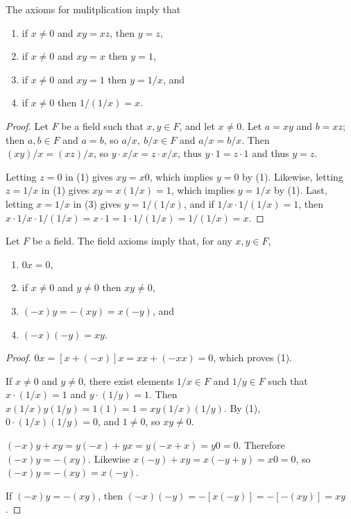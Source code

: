 \documentclass[12pt]{article}
\begin{document}
\begin{thm}
  The axioms for mulitplication imply that
  \begin{enumerate}
    \item
      if $x \neq 0$ and $xy = xz$, then $y = z$,
    \item
      if $x \neq 0$ and $xy = x$ then $y = 1$,
    \item
      if $x \neq 0$ and $xy = 1$ then $y = 1/x$, and
    \item
      if $x \neq 0$ then $1/(1/x) = x$.
  \end{enumerate}

  \begin{proof}
    Let $F$ be a field such that $x,y \in F$, and let $x \neq 0$. Let $a = xy$ and $b
    = xz$; then $a,b \in F$ and $a = b$, so $a/x,\ b/x \in F$ and $a/x = b/x$. Then
    $(xy)/x = (xz)/x$, so $y \cdot x/x = z \cdot x/x$, thus $y \cdot 1 = z \cdot 1$
    and thus $y = z$.

    Letting $z = 0$ in (1) gives $xy = x0$, which implies $y = 0$ by (1).  Likewise,
    letting $z = 1/x$ in (1) gives $xy = x(1/x) = 1$, which implies $y = 1/x$ by (1).
    Last, letting $x = 1/x$ in (3) gives $y = 1/(1/x)$, and if $1/x \cdot 1/(1/x) =
    1$, then $x \cdot 1/x \cdot 1/(1/x) = x \cdot 1 = 1 \cdot 1/(1/x) = 1/(1/x) = x$.
  \end{proof}
\end{thm}

\begin{thm}
  Let $F$ be a field. The field axioms imply that, for any $x,y \in F$,
  \begin{enumerate}
    \item
      $0x = 0$,
    \item
      if $x \neq 0$ and $y \neq 0$ then $xy \neq 0$,
    \item
      $(-x)y = -(xy) = x(-y)$, and
    \item
      $(-x)(-y) = xy$.
  \end{enumerate}

  \begin{proof}
    $0x = [x + (-x)]x = xx + (-xx) = 0$, which proves (1).

    If $x \neq 0$ and $y \neq 0$, there exist elements $1/x \in F$ and $1/y \in F$
    such that $x \cdot (1/x) = 1$ and $y \cdot (1/y) = 1$. Then $x(1/x)y(1/y) = 1(1)
    = 1 = xy(1/x)(1/y)$. By (1), $0 \cdot (1/x)(1/y) = 0$, and $1 \neq 0$, so $xy
    \neq 0$.

    $(-x)y + xy = y(-x) + yx = y(-x + x) = y0 = 0$. Therefore $(-x)y = -(xy)$.
    Likewise $x(-y) + xy = x(-y + y) = x0 = 0$, so $(-x)y = -(xy) = x(-y)$.

    If $(-x)y = -(xy)$, then $(-x)(-y) = -[x(-y)] = -[-(xy)] = xy$.
  \end{proof}
\end{thm}
\end{document}
